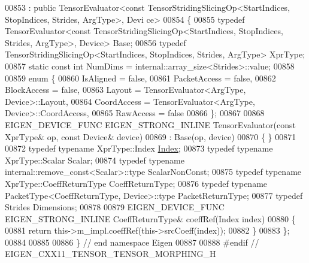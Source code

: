 \begin{DoxyCode}
00853   : \textcolor{keyword}{public} TensorEvaluator<const TensorStridingSlicingOp<StartIndices, StopIndices, Strides, ArgType>, Devi
      ce>
00854 \{
00855   \textcolor{keyword}{typedef} TensorEvaluator<const TensorStridingSlicingOp<StartIndices, StopIndices, Strides, ArgType>, 
      Device> Base;
00856   \textcolor{keyword}{typedef} TensorStridingSlicingOp<StartIndices, StopIndices, Strides, ArgType> XprType;
00857   \textcolor{keyword}{static} \textcolor{keyword}{const} \textcolor{keywordtype}{int} NumDims = internal::array\_size<Strides>::value;
00858 
00859   \textcolor{keyword}{enum} \{
00860     IsAligned = \textcolor{keyword}{false},
00861     PacketAccess = \textcolor{keyword}{false},
00862     BlockAccess = \textcolor{keyword}{false},
00863     Layout = TensorEvaluator<ArgType, Device>::Layout,
00864     CoordAccess = TensorEvaluator<ArgType, Device>::CoordAccess,
00865     RawAccess = \textcolor{keyword}{false}
00866   \};
00867 
00868   EIGEN\_DEVICE\_FUNC EIGEN\_STRONG\_INLINE TensorEvaluator(\textcolor{keyword}{const} XprType& op, \textcolor{keyword}{const} Device& device)
00869     : Base(op, device)
00870     \{ \}
00871 
00872   \textcolor{keyword}{typedef} \textcolor{keyword}{typename} XprType::Index \hyperlink{namespace_eigen_a62e77e0933482dafde8fe197d9a2cfde}{Index};
00873   \textcolor{keyword}{typedef} \textcolor{keyword}{typename} XprType::Scalar Scalar;
00874   \textcolor{keyword}{typedef} \textcolor{keyword}{typename} internal::remove\_const<Scalar>::type ScalarNonConst;
00875   \textcolor{keyword}{typedef} \textcolor{keyword}{typename} XprType::CoeffReturnType CoeffReturnType;
00876   \textcolor{keyword}{typedef} \textcolor{keyword}{typename} PacketType<CoeffReturnType, Device>::type PacketReturnType;
00877   \textcolor{keyword}{typedef} Strides Dimensions;
00878 
00879   EIGEN\_DEVICE\_FUNC EIGEN\_STRONG\_INLINE CoeffReturnType& coeffRef(Index index)
00880   \{
00881     \textcolor{keywordflow}{return} this->m\_impl.coeffRef(this->srcCoeff(index));
00882   \}
00883 \};
00884 
00885 
00886 \} \textcolor{comment}{// end namespace Eigen}
00887 
00888 \textcolor{preprocessor}{#endif // EIGEN\_CXX11\_TENSOR\_TENSOR\_MORPHING\_H}
\end{DoxyCode}
